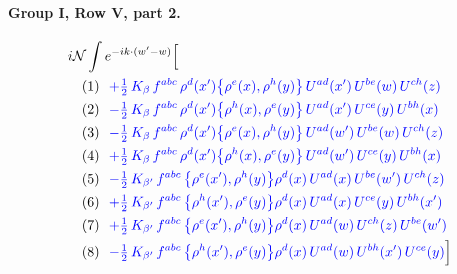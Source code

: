 \documentclass[10pt]{article}
\numberwithin{equation}{section}
\newcommand{\NN}{\mathcal N}
\begin{document}
\paragraph{Group I, Row V, part 2.}
\begin{align*}
&i\NN\int e^{-ik\cdot(w'-w)}\Big[\\
&\quad\text{(1)}\ \ \textcolor{blue}{+\tfrac12\,K_{\beta}\,f^{abc}\,\rho^{d}(x')\big\{\rho^{e}(x),\rho^{h}(y)\big\}\,U^{ad}(x')\,U^{be}(w)\,U^{ch}(z)}\\
&\quad\text{(2)}\ \ \textcolor{blue}{- \tfrac12\,K_{\beta}\,f^{abc}\,\rho^{d}(x')\big\{\rho^{h}(x),\rho^{e}(y)\big\}\,U^{ad}(x')\,U^{ce}(y)\,U^{bh}(x)}\\
&\quad\text{(3)}\ \ \textcolor{blue}{- \tfrac12\,K_{\beta}\,f^{abc}\,\rho^{d}(x')\big\{\rho^{e}(x),\rho^{h}(y)\big\}\,U^{ad}(w')\,U^{be}(w)\,U^{ch}(z)}\\
&\quad\text{(4)}\ \ \textcolor{blue}{+\tfrac12\,K_{\beta}\,f^{abc}\,\rho^{d}(x')\big\{\rho^{h}(x),\rho^{e}(y)\big\}\,U^{ad}(w')\,U^{ce}(y)\,U^{bh}(x)}\\
&\quad\text{(5)}\ \ \textcolor{blue}{- \tfrac12\,K_{\beta'}\,f^{abc}\,\big\{\rho^{e}(x'),\rho^{h}(y)\big\}\rho^{d}(x)\,U^{ad}(x)\,U^{be}(w')\,U^{ch}(z)}\\
&\quad\text{(6)}\ \ \textcolor{blue}{+\tfrac12\,K_{\beta'}\,f^{abc}\,\big\{\rho^{h}(x'),\rho^{e}(y)\big\}\rho^{d}(x)\,U^{ad}(x)\,U^{ce}(y)\,U^{bh}(x')}\\
&\quad\text{(7)}\ \ \textcolor{blue}{+\tfrac12\,K_{\beta'}\,f^{abc}\,\big\{\rho^{e}(x'),\rho^{h}(y)\big\}\rho^{d}(x)\,U^{ad}(w)\,U^{ch}(z)\,U^{be}(w')}\\
&\quad\text{(8)}\ \ \textcolor{blue}{- \tfrac12\,K_{\beta'}\,f^{abc}\,\big\{\rho^{h}(x'),\rho^{e}(y)\big\}\rho^{d}(x)\,U^{ad}(w)\,U^{bh}(x')\,U^{ce}(y)}\Big]
\end{align*}
\end{document}

